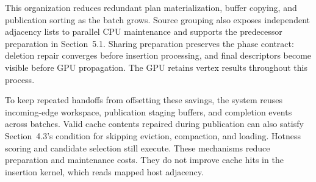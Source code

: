 This organization reduces redundant plan materialization, buffer copying, and publication sorting as the batch grows. Source grouping also exposes independent adjacency lists to parallel CPU maintenance and supports the predecessor preparation in Section~5.1. Sharing preparation preserves the phase contract: deletion repair converges before insertion processing, and final descriptors become visible before GPU propagation. The GPU retains vertex results throughout this process.

To keep repeated handoffs from offsetting these savings, the system reuses incoming-edge workspace, publication staging buffers, and completion events across batches. Valid cache contents repaired during publication can also satisfy Section~4.3's condition for skipping eviction, compaction, and loading. Hotness scoring and candidate selection still execute. These mechanisms reduce preparation and maintenance costs. They do not improve cache hits in the insertion kernel, which reads mapped host adjacency.
